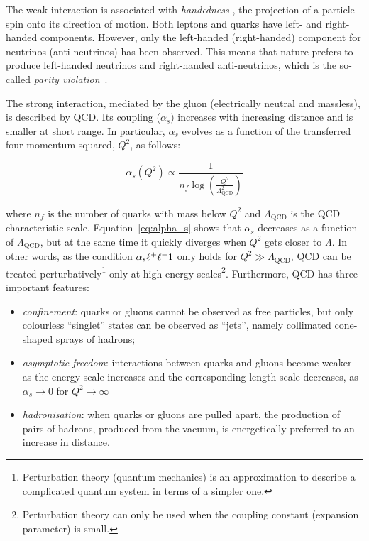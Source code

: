 			The weak interaction is associated with \textit{handedness} \ie, the projection of a particle spin onto its direction of motion. Both leptons and quarks have left- and right-handed components. However, only the left-handed (right-handed) component for neutrinos (anti-neutrinos) has been observed. This means that nature prefers to produce left-handed neutrinos and right-handed anti-neutrinos, which is the so-called \textit{parity violation}~\cite{Weinberg:1996kr}. 

			The strong interaction, mediated by the gluon (electrically neutral and massless), is described by \ac{QCD}. Its coupling ($\alpha_s)$ increases with increasing distance and is smaller at short range. In particular, $\alpha_s$ evolves as a function of the transferred four-momentum squared, $Q^2$, as follows: 

			\begin{equation}
				\label{eq:alpha_s}
				\alpha_s (Q^2) \propto \displaystyle \frac{1}{n_f \log (\frac{Q^2}{\Lambda_{\mathrm{QCD}}^2})} 
			\end{equation}

			\noindent where $n_f$ is the number of quarks with mass below $Q^2$ and $\Lambda_{\mathrm{QCD}}$ is the \ac{QCD} characteristic scale. Equation~\ref{eq:alpha_s} shows that $\alpha_s$ decreases as a function of $\Lambda_{\mathrm{QCD}}$, but at the same time it quickly diverges when $Q^2$ gets closer to $\Lambda$. In other words, as the condition $\alpha_s \muchless 1$ only holds for $Q^2 \gg \Lambda_{\mathrm{QCD}}$, \ac{QCD} can be treated perturbatively\footnote{Perturbation theory (quantum mechanics) is an approximation to describe a complicated quantum system in terms of a simpler one.} only at high energy scales\footnote{Perturbation theory can only be used when the coupling constant (expansion parameter) is small.}. Furthermore, \ac{QCD} has three important features:

			\begin{itemize}
				\item \emph{confinement}: quarks or gluons cannot be observed as free particles, but only colourless “singlet” states can be observed as “jets”, namely collimated cone-shaped sprays of hadrons; 

				\item \emph{asymptotic freedom}: interactions between quarks and gluons become weaker as the energy scale increases and the corresponding length scale decreases, as $\alpha_s \to 0$ for $Q^2 \to \infty$~%

				\item \emph{hadronisation}: when quarks or gluons are pulled apart, the production of pairs of hadrons, produced from the vacuum, is energetically preferred to an increase in distance.
			\end{itemize}

